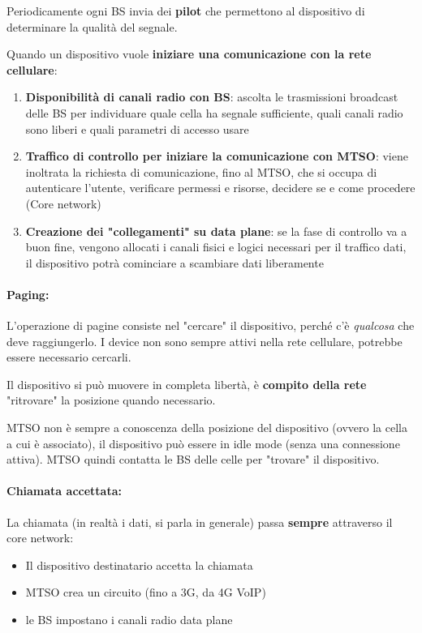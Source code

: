 Periodicamente ogni BS invia dei \textbf{pilot} che permettono al dispositivo di determinare la qualità del segnale.

Quando un dispositivo vuole \textbf{iniziare una comunicazione con la rete cellulare}:
\begin{enumerate}
	\item \textbf{Disponibilità di canali radio con BS}: ascolta le trasmissioni broadcast delle BS per individuare quale cella ha segnale sufficiente, quali canali radio sono liberi e quali parametri di accesso usare

	\item \textbf{Traffico di controllo per iniziare la comunicazione con MTSO}: viene inoltrata la richiesta di comunicazione, fino al MTSO, che si occupa di autenticare l'utente, verificare permessi e risorse, decidere se e come procedere (Core network)

	\item \textbf{Creazione dei "collegamenti" su data plane}: se la fase di controllo va a buon fine, vengono allocati i canali fisici e logici necessari per il traffico dati, il dispositivo potrà cominciare a scambiare dati liberamente
\end{enumerate}

\paragraph{Paging:} L'operazione di pagine consiste nel "cercare" il dispositivo, perché c'è \textit{qualcosa} che deve raggiungerlo. I device non sono sempre attivi nella rete cellulare, potrebbe essere necessario cercarli. 

Il dispositivo si può muovere in completa libertà, è \textbf{compito della rete} "ritrovare" la posizione quando necessario.

MTSO non è sempre a conoscenza della posizione del dispositivo (ovvero la cella a cui è associato), il dispositivo può essere in idle mode (senza una connessione attiva). MTSO quindi contatta le BS delle celle per "trovare" il dispositivo.

\paragraph{Chiamata accettata:} La chiamata (in realtà i dati, si parla in generale) passa \textbf{sempre} attraverso il core network:
\begin{itemize}
	\item Il dispositivo destinatario accetta la chiamata

	\item MTSO crea un circuito (fino a 3G, da 4G VoIP)

	\item le BS impostano i canali radio data plane
\end{itemize}


